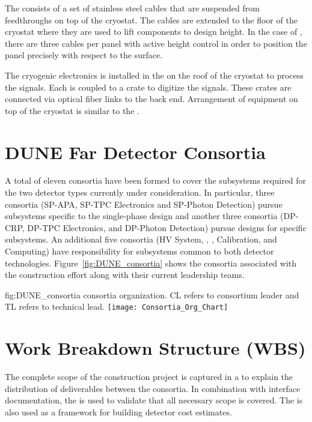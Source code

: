 The   consists of a set of stainless steel
cables that are suspended from feedthroughs on top of the
cryostat. The cables are extended to the floor of the cryostat where
they are used to lift components to design height. In the case of
, there are three cables per panel with active height
control in order to position the panel precisely with respect to the
 surface.

The cryogenic  electronics is installed in the
 on the roof of the cryostat to process the
 signals. Each  is coupled to a 
crate to digitize the signals. These crates are connected via optical
fiber links to the  back end. Arrangement of equipment on
top of the cryostat is similar to the .

\section{DUNE Far Detector Consortia}
\label{sec:fdconsortia}

A total of eleven  consortia have been formed to cover 
the subsystems required for the two detector types currently under
consideration.  In particular, three consortia (SP-APA, SP-TPC
Electronics and SP-Photon Detection) pursue subsystems specific to
the single-phase design and another three consortia (DP-CRP, DP-TPC
Electronics, and DP-Photon Detection) pursue designs for 
specific subsystems.  An additional five consortia (HV System, ,
, Calibration, and Computing)
have responsibility for subsystems common to both detector
technologies.  Figure~\ref{fig:DUNE_consortia} shows the consortia 
associated with the  construction effort along with their 
current leadership teams.  
\begin{dunefigure}{fig:DUNE_consortia}
  { consortia organization. CL refers to consortium leader
    and TL refers to technical lead.}
  \texttt{[image: Consortia\_Org\_Chart]}
\end{dunefigure}

\section{Work Breakdown Structure (WBS)}
\label{sec:fdsp-coord-wbs}

The complete scope of the  construction project is captured in a 
 to explain the distribution of deliverables between 
the consortia.  In combination with interface documentation, the 
 is used to validate that all necessary scope is covered.  The 
 is also used as a framework for building  
detector cost estimates.

